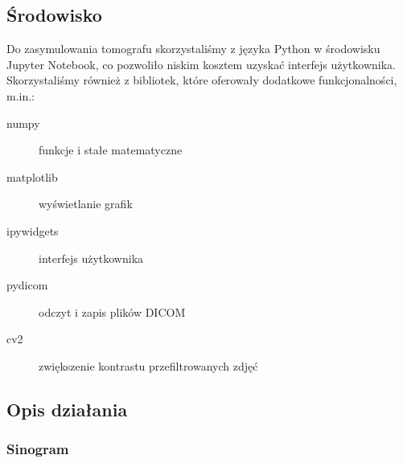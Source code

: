 \documentclass[polish,polish,a4paper]{article}
\begin{document}
		\subsection{Środowisko}
			Do zasymulowania tomografu skorzystaliśmy z języka Python w środowisku Jupyter Notebook,
			 co pozwoliło niskim kosztem uzyskać interfejs użytkownika.
			 Skorzystaliśmy również z bibliotek, które oferowały dodatkowe funkcjonalności, m.in.:
			
			\begin{description}
				\item[numpy] funkcje i stałe matematyczne
				\item[matplotlib] wyświetlanie grafik
				\item[ipywidgets] interfejs użytkownika
				\item[pydicom] odczyt i zapis plików DICOM
				\item[cv2] zwiększenie kontrastu przefiltrowanych zdjęć
			\end{description}
			
			\subsection{Opis działania}
				\subsubsection{Sinogram}
				
\end{document}
